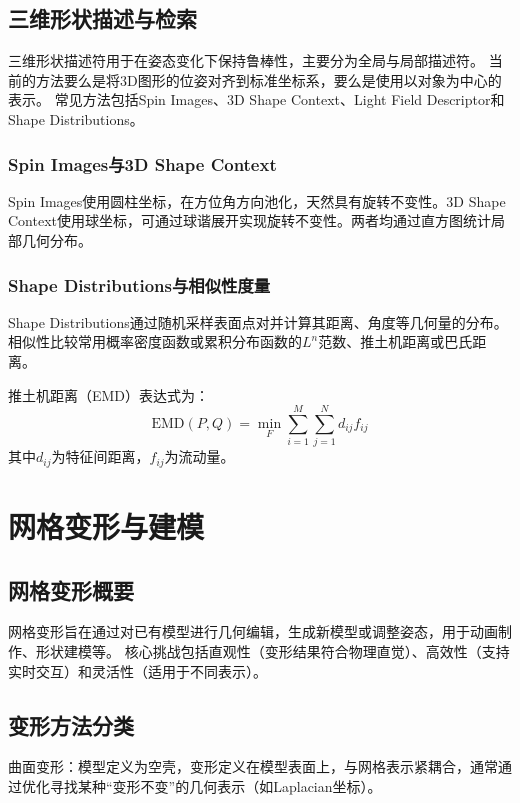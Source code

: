 \documentclass[12pt]{article}
\begin{document}
\subsection{三维形状描述与检索}

三维形状描述符用于在姿态变化下保持鲁棒性，主要分为全局与局部描述符。
当前的方法要么是将3D图形的位姿对齐到标准坐标系，要么是使用以对象为中心的表示。
常见方法包括Spin Images、3D Shape Context、Light Field Descriptor和Shape Distributions。

\subsubsection{Spin Images与3D Shape Context}
Spin Images使用圆柱坐标，在方位角方向池化，天然具有旋转不变性。3D Shape Context使用球坐标，可通过球谐展开实现旋转不变性。两者均通过直方图统计局部几何分布。

\subsubsection{Shape Distributions与相似性度量}
Shape Distributions通过随机采样表面点对并计算其距离、角度等几何量的分布。相似性比较常用概率密度函数或累积分布函数的$L^n$范数、推土机距离或巴氏距离。

推土机距离（EMD）表达式为：
\[
\text{EMD}(P,Q) = \min_{F} \sum_{i=1}^M \sum_{j=1}^N d_{ij} f_{ij}
\]
其中$d_{ij}$为特征间距离，$f_{ij}$为流动量。

\newpage

\section{网格变形与建模}

\subsection{网格变形概要}

网格变形旨在通过对已有模型进行几何编辑，生成新模型或调整姿态，用于动画制作、形状建模等。
核心挑战包括直观性（变形结果符合物理直觉）、高效性（支持实时交互）和灵活性（适用于不同表示）。

\subsection{变形方法分类}

曲面变形：模型定义为空壳，变形定义在模型表面上，与网格表示紧耦合，通常通过优化寻找某种“变形不变”的几何表示（如Laplacian坐标）。
\end{document}
